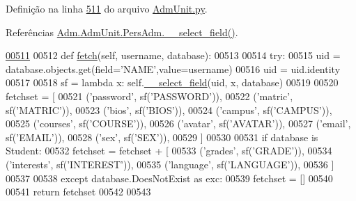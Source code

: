 Definição na linha \hyperlink{AdmUnit_8py_source_l00511}{511} do arquivo \hyperlink{AdmUnit_8py_source}{Adm\-Unit.\-py}.



Referências \hyperlink{AdmUnit_8py_source_l00495}{Adm.\-Adm\-Unit.\-Pers\-Adm.\-\_\-\-\_\-select\-\_\-field()}.


\begin{DoxyCode}
\hypertarget{classAdm_1_1AdmUnit_1_1PersAdm_l00511}{}\hyperlink{classAdm_1_1AdmUnit_1_1PersAdm_a021e43040d51fa147a42018ced240a84}{00511} 
00512     \textcolor{keyword}{def }\hyperlink{classAdm_1_1AdmUnit_1_1PersAdm_a021e43040d51fa147a42018ced240a84}{fetch}(self, username, database):
00513 
00514         \textcolor{keywordflow}{try}:
00515             uid = database.objects.get(field=\textcolor{stringliteral}{'NAME'},value=username)
00516             uid = uid.identity
00517 
00518             sf = \textcolor{keyword}{lambda} x: self.\hyperlink{classAdm_1_1AdmUnit_1_1PersAdm_a2e5fd44c72dfc852a0b44b9b4ca566f9}{\_\_select\_field}(uid, x, database)
00519 
00520             fetchset = [
00521                     (\textcolor{stringliteral}{'password'},    sf(\textcolor{stringliteral}{'PASSWORD'})),
00522                     (\textcolor{stringliteral}{'matric'},      sf(\textcolor{stringliteral}{'MATRIC'})),
00523                     (\textcolor{stringliteral}{'bios'},        sf(\textcolor{stringliteral}{'BIOS'})),
00524                     (\textcolor{stringliteral}{'campus'},      sf(\textcolor{stringliteral}{'CAMPUS'})),
00525                     (\textcolor{stringliteral}{'courses'},     sf(\textcolor{stringliteral}{'COURSE'})),
00526                     (\textcolor{stringliteral}{'avatar'},      sf(\textcolor{stringliteral}{'AVATAR'})),
00527                     (\textcolor{stringliteral}{'email'},       sf(\textcolor{stringliteral}{'EMAIL'})),
00528                     (\textcolor{stringliteral}{'sex'},         sf(\textcolor{stringliteral}{'SEX'})),
00529             ]
00530 
00531             \textcolor{keywordflow}{if} database \textcolor{keywordflow}{is} Student:
00532                 fetchset = fetchset + [     
00533                     (\textcolor{stringliteral}{'grades'},      sf(\textcolor{stringliteral}{'GRADE'})),
00534                     (\textcolor{stringliteral}{'interests'},   sf(\textcolor{stringliteral}{'INTEREST'})),
00535                     (\textcolor{stringliteral}{'language'},    sf(\textcolor{stringliteral}{'LANGUAGE'})),
00536                 ]
00537 
00538         \textcolor{keywordflow}{except} database.DoesNotExist \textcolor{keyword}{as} exc:
00539             fetchset = []
00540 
00541         \textcolor{keywordflow}{return} fetchset
00542 
00543 
\end{DoxyCode}
